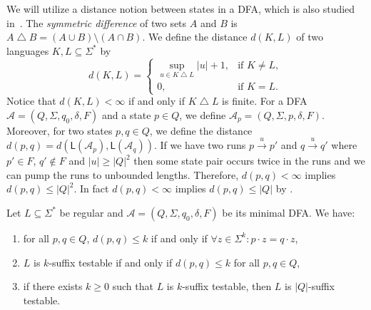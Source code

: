 \documentclass{article}\usepackage[a4paper,margin=20mm]{geometry}
\newcommand{\A}{\mathcal{A}}
\renewcommand{\L}{\mathsf{L}}
\renewcommand{\geq}{\geqslant}
\renewcommand{\leq}{\leqslant}
\renewcommand{\ge}{\geq}
\renewcommand{\le}{\leq}
\begin{document}
We will utilize a distance notion between states in a DFA,
which is also studied in~\cite{GawrychowskiJ09}.
The {\em symmetric difference} of two sets $A$ and $B$ is $A \mathop{\triangle} B = (A \cup B) \setminus (A \cap B)$.
We define the distance $d(K,L)$ of two languages $K,L\subseteq\Sigma^*$ by
\[
	d(K,L) = \begin{cases}
	\sup_{u \in K \mathop{\triangle} L} |u| + 1, & \text{if } K \neq L, \\
	0, & \text{if } K = L.
	\end{cases}
\]
Notice that $d(K,L)<\infty$ if and only if $K\mathop{\triangle} L$ is finite.
For a DFA $\A = (Q,\Sigma,q_0,\delta,F)$ and a state $p\in Q$, we define $\A_p = (Q,\Sigma,p,\delta,F)$.
Moreover, for two states $p,q\in Q$, we define the distance $d(p,q)=d(\L(\A_p),\L(\A_q))$.
If we have two runs $p \xrightarrow{u} p'$ and $q \xrightarrow{u} q'$ where $p' \in F$,
$q' \notin F$ and $|u| \ge |Q|^2$ then some state pair occurs twice in the runs
and we can pump the runs to unbounded lengths.
Therefore, $d(p,q) < \infty$ implies $d(p,q) \le |Q|^2$.
In fact $d(p,q) < \infty$ implies $d(p,q) \le |Q|$ by \cite[Lemma~1]{GawrychowskiJ09}.
	
\begin{lemma}
	\label{lem:testable-distance}
	Let $L \subseteq \Sigma^*$ be regular and $\A = (Q,\Sigma,q_0,\delta,F)$ be its minimal DFA. 
	We have:
	\begin{enumerate}[label=(\roman{*}), ref=(\roman{*})]
		\item for all $p,q \in Q$, $d(p,q) \le k$ if and only if $\forall z \in \Sigma^k : p \cdot z = q \cdot z$,
		\label{item:st1}
		\item $L$ is $k$-suffix testable if and only if $d(p,q) \le k$ for all $p,q \in Q$,
		\label{item:st2}
		\item if there exists $k \ge 0$ such that $L$ is $k$-suffix testable, then $L$ is $|Q|$-suffix testable.
		\label{item:st3}
	\end{enumerate}
\end{lemma}
\end{document}
